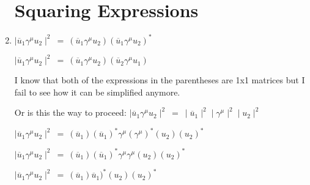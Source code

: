 \documentclass[12pt]{article}
\def \ou{\overline{u}}
\def \ga{\gamma}
\begin{document}
\begin{enumerate}
\section{Squaring Expressions}
\item $\mid \ou_1 \ga^\mu u_2 \mid^2 ~=~ (\ou_1 \ga^\mu u_2)(\ou_1 \ga^\mu u_2 )^*$

$\mid \ou_1 \ga^\mu u_2 \mid^2 ~=~ (\ou_1 \ga^\mu u_2)(\ou_2 \ga^\mu u_1)$

I know that both of the expressions in the parentheses are 1x1 matrices but I fail to see how it can be simplified anymore.

Or is this the way to proceed:
$\mid \ou_1 \ga^\mu u_2 \mid^2 ~=~ \mid\ou_1\mid^2 \mid\ga^\mu\mid^2 \mid u_2 \mid^2$

$\mid \ou_1 \ga^\mu u_2 \mid^2 ~=~ (\ou_1)(\overline{u}_1)^*\ga^\mu (\ga^\mu)^* (u_2)(u_2)^*$

$\mid \ou_1 \ga^\mu u_2 \mid^2 ~=~ (\ou_1)(\ou_1)^*\ga^\mu \ga^\mu (u_2)(u_2)^*$

$\mid \ou_1 \ga^\mu u_2 \mid^2 ~=~ (\ou_1)\ou_1)^* (u_2)(u_2)^*$

\end{enumerate}
\end{document}
